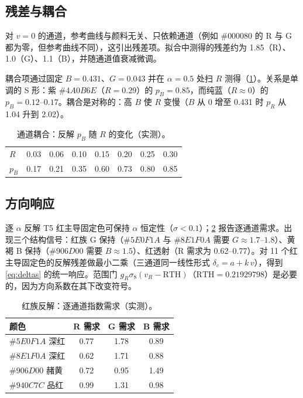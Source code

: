 \subsection{残差与耦合}
对 $v=0$ 的通道，参考曲线与颜料无关、只依赖通道（例如 $\#000080$ 的 R 与 G 都为零，但参考曲线不同），这引出残差项。拟合中测得的残差约为 1.85（R）、1.0（G）、1.1（B），并随通道值衰减微调。

耦合项通过固定 $B=0.431$、$G=0.043$ 并在 $\alpha=0.5$ 处扫 $R$ 测得（\cref{tab:d3}）。关系是单调的 S 形：紫 $\#4A0B6E$（$R=0.29$）的 $p_{B}=0.85$，而纯蓝（$R\approx0$）的 $p_{B}=0.12$--$0.17$。耦合是对称的：高 $B$ 使 $R$ 变慢（$B$ 从 0 增至 0.431 时 $p_{R}$ 从 1.04 升到 2.02）。

\begin{table}[t]
\centering
\small
\caption{通道耦合：反解 $p_{B}$ 随 $R$ 的变化（实测）。}
\label{tab:d3}
\begin{tabular}{lccccccc}
\toprule
$R$ & 0.03 & 0.06 & 0.10 & 0.15 & 0.20 & 0.25 & 0.30 \\
$p_{B}$ & 0.17 & 0.21 & 0.35 & 0.60 & 0.73 & 0.80 & 0.85 \\
\bottomrule
\end{tabular}
\end{table}

\subsection{方向响应}
逐 $\alpha$ 反解 T5 红主导固定色可保持 $\alpha$ 恒定性（$\sigma<0.1$）；\cref{tab:d4} 报告逐通道需求。出现三个结构信号：红族 G 保持（$\#5E0F1A$ 与 $\#8E1F0A$ 需要 $G\approx1.7$--$1.8$）、黄褐 B 保持（$\#906D00$ 需要 $B\approx1.5$）、红透射（R 需求为 0.62--0.77）。对 11 个红主导固定色的反解残差做最小二乘（三通道同一线性形式 $\delta_{c}=a+k\,v$），得到 \cref{eq:deltas} 的统一响应。范围门 $g_{R}\sigma_{8}(v_{R}-\mathrm{RTH})$（$\mathrm{RTH}=0.21929798$）是必要的，因为方向系数在其下改变符号。

\begin{table}[t]
\centering
\small
\caption{红族反解：逐通道指数需求（实测）。}
\label{tab:d4}
\begin{tabular}{lccc}
\toprule
颜色 & R 需求 & G 需求 & B 需求 \\
\midrule
$\#5E0F1A$ 深红 & 0.77 & 1.78 & 0.89 \\
$\#8E1F0A$ 深红 & 0.62 & 1.71 & 0.88 \\
$\#906D00$ 赭黄 & 0.72 & 0.95 & 1.49 \\
$\#940C7C$ 品红 & 0.99 & 1.31 & 0.98 \\
\bottomrule
\end{tabular}
\end{table}

